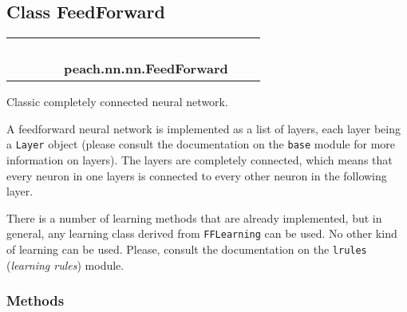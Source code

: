 
\subsection{Class FeedForward}

    \label{peach:nn:nn:FeedForward}
\begin{tabular}{cccccccc}
\multicolumn{2}{r}{\settowidth{\BCL}{object}\multirow{2}{\BCL}{object}}
&&
&&
  \\\cline{3-3}
  &&\multicolumn{1}{c|}{}
&&
&&
  \\
\multicolumn{4}{r}{\settowidth{\BCL}{list}\multirow{2}{\BCL}{list}}
&&
  \\\cline{5-5}
  &&&&\multicolumn{1}{c|}{}
&&
  \\
&&&&\multicolumn{2}{l}{\textbf{peach.nn.nn.FeedForward}}
\end{tabular}


Classic completely connected neural network.

A feedforward neural network is implemented as a list of layers, each layer
being a \texttt{Layer} object (please consult the documentation on the \texttt{base}
module for more information on layers). The layers are completely connected,
which means that every neuron in one layers is connected to every other
neuron in the following layer.

There is a number of learning methods that are already implemented, but in
general, any learning class derived from \texttt{FFLearning} can be used. No
other kind of learning can be used. Please, consult the documentation on the
\texttt{lrules} (\emph{learning rules}) module.


  \subsubsection{Methods}

